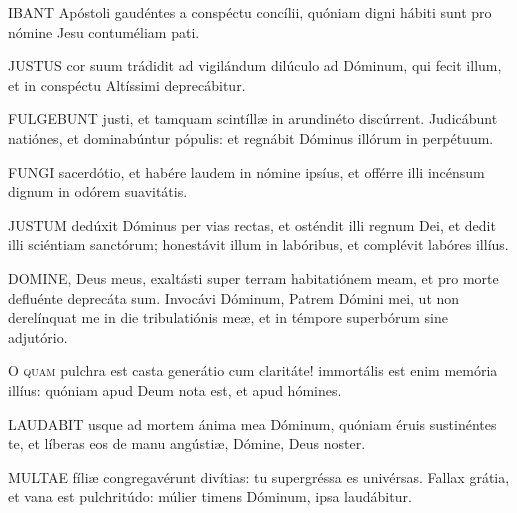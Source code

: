

\lettrine[lines=2]{I}{BANT} Apóstoli gaudéntes a conspéctu concílii, quóniam digni hábiti sunt pro nómine Jesu contuméliam pati.


\lettrine[lines=2]{J}{USTUS} cor suum trádidit ad vigilándum dilúculo ad Dóminum, qui fecit illum, et in conspéctu Altíssimi deprecábitur.


\lettrine[lines=2]{F}{ULGEBUNT} justi, et tamquam scintíllæ in arundinéto discúrrent. Judicábunt natiónes, et dominabúntur pópulis: et regnábit Dóminus illórum in perpétuum.


\lettrine[lines=2]{F}{UNGI} sacerdótio, et habére laudem in nómine ipsíus, et offérre illi incénsum dignum in odórem suavitátis.


\lettrine[lines=2]{J}{USTUM} dedúxit Dóminus per vias rectas, et osténdit illi regnum Dei, et dedit illi sciéntiam sanctórum; honestávit illum in labóribus, et complévit labóres illíus.


\lettrine[lines=2]{D}{OMINE}, Deus meus, exaltásti super terram habitatiónem meam, et pro morte defluénte deprecáta sum. Invocávi Dóminum, Patrem Dómini mei, ut non derelínquat me in die tribulatiónis meæ, et in témpore superbórum sine adjutório.


\lettrine[lines=2]{O}{} \textsc{quam} pulchra est casta generátio cum claritáte! immortális est enim memória illíus: quóniam apud Deum nota est, et apud hómines.


\lettrine[lines=2]{L}{AUDABIT} usque ad mortem ánima mea Dóminum, quóniam éruis sustinéntes te, et líberas eos de manu angústiæ, Dómine, Deus noster.


\lettrine[lines=2]{M}{ULTAE} fíliæ congregavérunt divítias: tu supergréssa es univérsas. Fallax grátia, et vana est pulchritúdo: múlier timens Dóminum, ipsa laudábitur.

